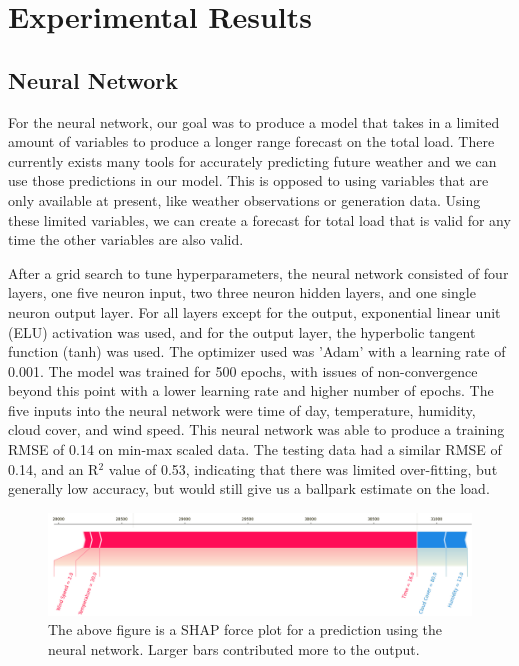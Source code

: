 \documentclass[10pt]{article}
\begin{document}
\section{Experimental Results}\label{sec:5}

\subsection{Neural Network}

For the neural network, our goal was to produce a model that takes in a limited amount of variables to produce a longer range forecast on the total load. There currently exists many tools for accurately predicting future weather and we can use those predictions in our model. This is opposed to using variables that are only available at present, like weather observations or generation data. Using these limited variables, we can create a forecast for total load that is valid for any time the other variables are also valid.

After a grid search to tune hyperparameters, the neural network consisted of four layers, one five neuron input, two three neuron hidden layers, and one single neuron output layer. For all layers except for the output, exponential linear unit (ELU) activation was used, and for the output layer, the hyperbolic tangent function (tanh) was used. The optimizer used was 'Adam' with a learning rate of 0.001. The model was trained for 500 epochs, with issues of non-convergence beyond this point with a lower learning rate and higher number of epochs. The five inputs into the neural network were time of day, temperature, humidity, cloud cover, and wind speed. This neural network was able to produce a training RMSE of 0.14 on min-max scaled data. The testing data had a similar RMSE of 0.14, and an R$^2$ value of 0.53, indicating that there was limited over-fitting, but generally low accuracy, but would still give us a ballpark estimate on the load.

\begin{figure}[H]
    \centering
    \includegraphics[scale=0.39]{shap_nn.png}
    \caption {The above figure is a SHAP force plot for a prediction using the neural network. Larger bars contributed more to the output.}
    \label{shap_nn}
\end{figure}
\end{document}
